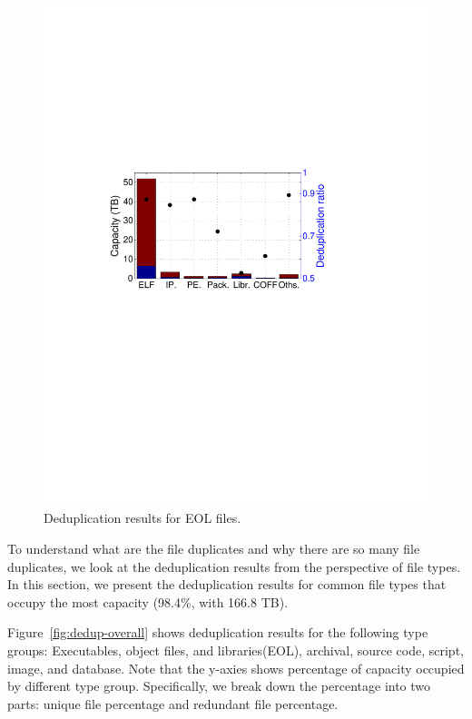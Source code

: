 \begin{figure}[t]
\begin{minipage}{0.22\textwidth}
		\includegraphics[width=1\textwidth]{graphs/dedup-eol}
		\caption{Deduplication results for EOL files.}
		\label{fig:dedup-eol}
	\end{minipage}%
\end{figure}

To understand what are the file duplicates and why there are so many file duplicates, we look at the deduplication results from the perspective of file types. In this section, we present the deduplication results for common file types that occupy the most capacity (98.4\%, with 166.8 TB).

Figure~\ref{fig:dedup-overall} shows deduplication results for 
the following type groups: Executables, object files, and libraries(EOL), archival, source code, script, image, and database. Note that the y-axies shows percentage of capacity occupied by different type group. Specifically, we break down the percentage into two parts: unique file percentage and redundant file percentage.

